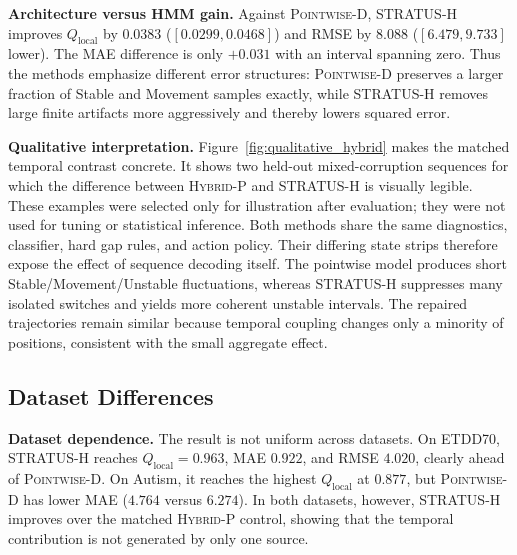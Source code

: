 \documentclass[sigconf,review]{acmart}
\newcommand{\methodP}{\textsc{Pointwise-D}\xspace}
\newcommand{\methodHP}{\textsc{Hybrid-P}\xspace}
\newcommand{\methodH}{\textsc{STRATUS-H}\xspace}
\begin{document}
\textbf{Architecture versus HMM gain.} Against \methodP, \methodH improves $Q_{\mathrm{local}}$ by $0.0383$ ($[0.0299,0.0468]$) and RMSE by $8.088$ ($[6.479,9.733]$ lower). The MAE difference is only $+0.031$ with an interval spanning zero. Thus the methods emphasize different error structures: \methodP preserves a larger fraction of Stable and Movement samples exactly, while \methodH removes large finite artifacts more aggressively and thereby lowers squared error.





\textbf{Qualitative interpretation.} Figure~\ref{fig:qualitative_hybrid} makes the matched temporal contrast concrete. It shows two held-out mixed-corruption sequences for which the difference between \methodHP and \methodH is visually legible. These examples were selected only for illustration after evaluation; they were not used for tuning or statistical inference. Both methods share the same diagnostics, classifier, hard gap rules, and action policy. Their differing state strips therefore expose the effect of sequence decoding itself. The pointwise model produces short Stable/Movement/Unstable fluctuations, whereas \methodH suppresses many isolated switches and yields more coherent unstable intervals. The repaired trajectories remain similar because temporal coupling changes only a minority of positions, consistent with the small aggregate effect.



\subsection{Dataset Differences}

\textbf{Dataset dependence.} The result is not uniform across datasets. On ETDD70, \methodH reaches $Q_{\mathrm{local}}=0.963$, MAE $0.922$, and RMSE $4.020$, clearly ahead of \methodP. On Autism, it reaches the highest $Q_{\mathrm{local}}$ at $0.877$, but \methodP has lower MAE ($4.764$ versus $6.274$). In both datasets, however, \methodH improves over the matched \methodHP control, showing that the temporal contribution is not generated by only one source.
\end{document}
